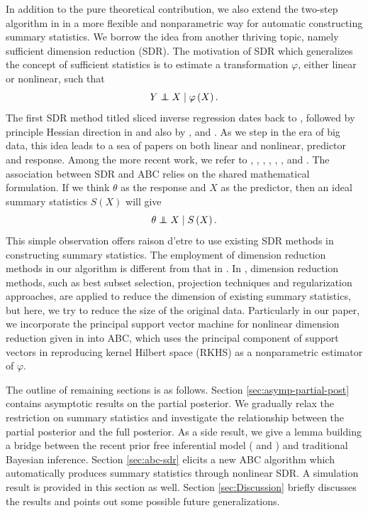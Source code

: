 \documentclass[oneside,english]{amsbook}
\numberwithin{section}{chapter}
\numberwithin{equation}{section}
\numberwithin{figure}{section}
\theoremstyle{plain}
\theoremstyle{plain}
\theoremstyle{definition}
\theoremstyle{plain}
\theoremstyle{plain}
\theoremstyle{remark}
\theoremstyle{definition}
\theoremstyle{definition}
\newcommand\independent{\protect\mathpalette{\protect\independenT}{\perp}}
\def\independenT#1#2{\mathrel{\rlap{$#1#2$}\mkern2mu{#1#2}}}
\begin{document}
In addition to the pure theoretical contribution, we also extend the{}
{two-step}{} algorithm in \citet{fearnhead2012constructing}
in a more flexible and nonparametric way for automatic constructing
summary statistics. We borrow the idea from another thriving topic,
namely sufficient dimension reduction (SDR). The motivation of SDR
which generalizes the concept of sufficient statistics is to estimate{}
{a} transformation $\varphi$, either{}
linear or nonlinear, such that 
\begin{equation}
Y\independent X\mid\varphi\left(X\right).\label{eq:sdr}
\end{equation}
 The first SDR method titled sliced inverse regression dates back
to \citet{li1991sliced}, followed by principle Hessian direction
in \citet{li1992principal} and also by \citet{1991}, and \citet{cook1998principal}.
As we step in the era of big data, this idea leads to a sea of papers
on both linear and nonlinear, predictor and response. Among the more
recent work, we refer to \citet{cook2002dimension}, \citet{xia2002adaptive},
\citet{li2005contour}, \citet{li2009dimension}, \citet{wu2008kernel},
\citet{yeh2009nonlinear}, \citet{su2011partial} and \citet{su2012inner}.
The association between SDR and ABC relies on the shared mathematical
formulation. If we think $\theta$ as the response and $X$ as the
predictor, then an ideal summary statistics $S\left(X\right)$ will
give 
\[
\theta\independent X\mid S\left(X\right).
\]
This simple observation offers raison d'etre to use existing SDR methods
in constructing summary statistics. The employment of dimension reduction
methods in our algorithm is different from that in \citet{blum2013comparative}.
In \citet{blum2013comparative}, dimension reduction methods, such
as best subset selection, projection techniques and regularization
approaches, are applied to reduce the dimension of existing summary
statistics, but here, we try to reduce the size of the original data.
Particularly in our paper, we incorporate the principal  support vector
machine for nonlinear dimension reduction given in \citet{li2011principal}
into ABC, which uses the{} {principal
} component of support vectors in reproducing kernel Hilbert space
(RKHS) as a nonparametric estimator of $\varphi$. 

The outline of remaining sections is as follows. Section \ref{sec:asymp-partial-post}
contains asymptotic results on the partial posterior. We gradually
relax the restriction on summary statistics and investigate the relationship
between the partial posterior and the full posterior. As a side result,
we give a lemma building a bridge between the recent prior free inferential
model (\citet{martin2013inferential} and \citet{martin2015conditional})
and traditional Bayesian inference. Section \ref{sec:abc-sdr} elicits
a new ABC algorithm which automatically produces summary statistics
through nonlinear SDR. A simulation result is provided in this section{}
{as well}. Section \ref{sec:Discussion} briefly
discusses the results and points out some possible future generalizations.
\end{document}
